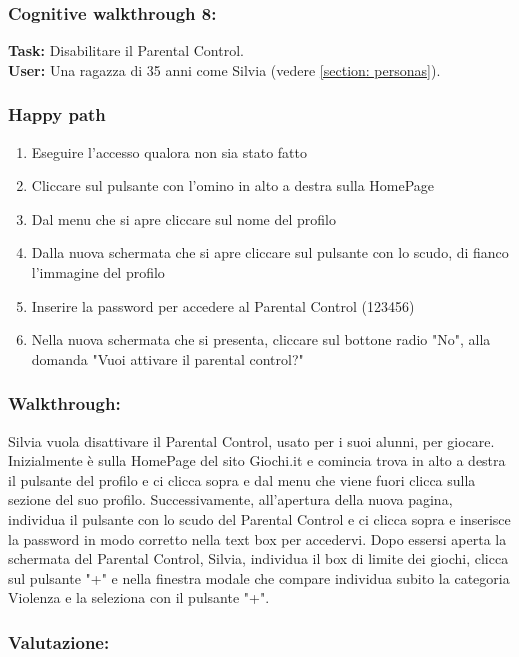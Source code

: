 \documentclass[../Report.tex]{subfiles}
\begin{document}
    \subsubsection{Cognitive walkthrough 8:}
    \textbf{Task:} Disabilitare il Parental Control.\\
    \textbf{User:} Una ragazza di 35 anni come Silvia (vedere \ref{section: personas}).\\

    \subsubsection{Happy path}
    \begin{enumerate}
        \item Eseguire l'accesso qualora non sia stato fatto 
        \item Cliccare sul pulsante con l’omino in alto a destra sulla HomePage
        \item Dal menu che si apre cliccare sul nome del profilo
        \item Dalla nuova schermata che si apre cliccare sul pulsante con lo scudo, di fianco l'immagine del profilo
        \item Inserire la password per accedere al Parental Control (123456)
        \item Nella nuova schermata che si presenta, cliccare sul bottone radio "No", alla domanda "Vuoi attivare il parental control?"
    \end{enumerate}

    \subsubsection{Walkthrough:}
    Silvia vuola disattivare il Parental Control, usato per i suoi alunni, per giocare. Inizialmente è sulla HomePage del sito Giochi.it e comincia trova in alto a destra il pulsante del profilo e ci clicca sopra e dal menu che viene fuori clicca sulla sezione del suo profilo. Successivamente, all'apertura della nuova pagina, individua il pulsante con lo scudo del Parental Control e ci clicca sopra e inserisce la password in modo corretto nella text box per accedervi. Dopo essersi aperta la schermata del Parental Control, Silvia, individua il box di limite dei giochi, clicca sul pulsante "+" e nella finestra modale che compare individua subito la categoria Violenza e la seleziona con il pulsante "+".  
    \subsubsection{Valutazione:}
\end{document}
